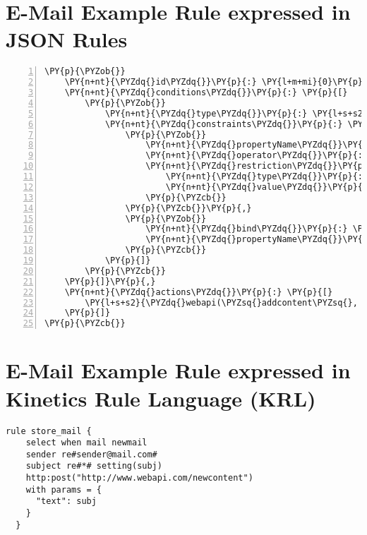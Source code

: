 \section{E-Mail Example Rule expressed in JSON Rules}
\begin{Verbatim}[frame=single,fontsize=\footnotesize,commandchars=\\\{\},numbers=left,firstnumber=1,stepnumber=1,xleftmargin
=.3in]
\PY{p}{\PYZob{}}
    \PY{n+nt}{\PYZdq{}id\PYZdq{}}\PY{p}{:} \PY{l+m+mi}{0}\PY{p}{,}
    \PY{n+nt}{\PYZdq{}conditions\PYZdq{}}\PY{p}{:} \PY{p}{[}
        \PY{p}{\PYZob{}}
            \PY{n+nt}{\PYZdq{}type\PYZdq{}}\PY{p}{:} \PY{l+s+s2}{\PYZdq{}email\PYZdq{}}\PY{p}{,}
            \PY{n+nt}{\PYZdq{}constraints\PYZdq{}}\PY{p}{:} \PY{p}{[}
                \PY{p}{\PYZob{}}
                    \PY{n+nt}{\PYZdq{}propertyName\PYZdq{}}\PY{p}{:} \PY{l+s+s2}{\PYZdq{}sender\PYZdq{}}\PY{p}{,}
                    \PY{n+nt}{\PYZdq{}operator\PYZdq{}}\PY{p}{:} \PY{l+s+s2}{\PYZdq{}EQ\PYZdq{}}\PY{p}{,}
                    \PY{n+nt}{\PYZdq{}restriction\PYZdq{}}\PY{p}{:} \PY{p}{\PYZob{}}
                        \PY{n+nt}{\PYZdq{}type\PYZdq{}}\PY{p}{:} \PY{l+s+s2}{\PYZdq{}String\PYZdq{}}\PY{p}{,}
                        \PY{n+nt}{\PYZdq{}value\PYZdq{}}\PY{p}{:} \PY{l+s+s2}{\PYZdq{}sender@mail.com\PYZdq{}}
                    \PY{p}{\PYZcb{}}
                \PY{p}{\PYZcb{}}\PY{p}{,}
                \PY{p}{\PYZob{}}
                    \PY{n+nt}{\PYZdq{}bind\PYZdq{}}\PY{p}{:} \PY{l+s+s2}{\PYZdq{}\PYZdl{}S\PYZdq{}}\PY{p}{,}
                    \PY{n+nt}{\PYZdq{}propertyName\PYZdq{}}\PY{p}{:} \PY{l+s+s2}{\PYZdq{}subject\PYZdq{}}
                \PY{p}{\PYZcb{}}
            \PY{p}{]}
        \PY{p}{\PYZcb{}}
    \PY{p}{]}\PY{p}{,}
    \PY{n+nt}{\PYZdq{}actions\PYZdq{}}\PY{p}{:} \PY{p}{[}
        \PY{l+s+s2}{\PYZdq{}webapi(\PYZsq{}addcontent\PYZsq{}, \PYZdl{}S)\PYZdq{}}
    \PY{p}{]}
\PY{p}{\PYZcb{}}
\end{Verbatim}


\section{E-Mail Example Rule expressed in Kinetics Rule Language (KRL)}
\begin{lstlisting}[nolol,float=h,label=lstkre,language=KRE,caption=E-Mail Example rule in KRL]
  rule store_mail {
    select when mail newmail
    sender re#sender@mail.com#
    subject re#*# setting(subj)
    http:post("http://www.webapi.com/newcontent")
    with params = {
      "text": subj
    }
  }
\end{lstlisting}


